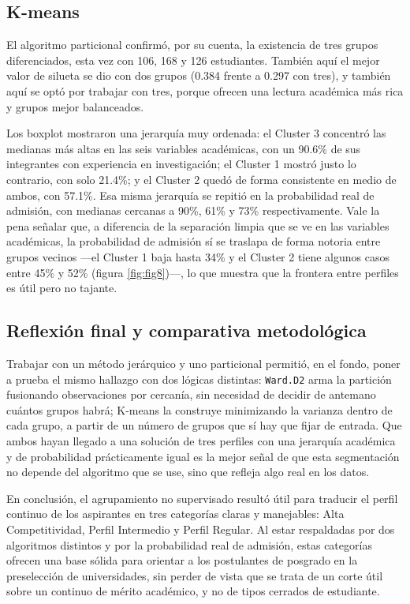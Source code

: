 \documentclass[
  10pt,
  a4paper]{article}
\begin{document}
\subsection{K-means}\label{k-means-1}

El algoritmo particional confirmó, por su cuenta, la existencia de tres grupos diferenciados, esta vez con 106, 168 y 126 estudiantes. También aquí el mejor valor de silueta se dio con dos grupos (0.384 frente a 0.297 con tres), y también aquí se optó por trabajar con tres, porque ofrecen una lectura académica más rica y grupos mejor balanceados.

Los boxplot mostraron una jerarquía muy ordenada: el Cluster 3 concentró las medianas más altas en las seis variables académicas, con un 90.6\% de sus integrantes con experiencia en investigación; el Cluster 1 mostró justo lo contrario, con solo 21.4\%; y el Cluster 2 quedó de forma consistente en medio de ambos, con 57.1\%. Esa misma jerarquía se repitió en la probabilidad real de admisión, con medianas cercanas a 90\%, 61\% y 73\% respectivamente. Vale la pena señalar que, a diferencia de la separación limpia que se ve en las variables académicas, la probabilidad de admisión sí se traslapa de forma notoria entre grupos vecinos ---el Cluster 1 baja hasta 34\% y el Cluster 2 tiene algunos casos entre 45\% y 52\% (figura \ref{fig:fig8})---, lo que muestra que la frontera entre perfiles es útil pero no tajante.

\subsection{Reflexión final y comparativa metodológica}\label{reflexiuxf3n-final-y-comparativa-metodoluxf3gica}

Trabajar con un método jerárquico y uno particional permitió, en el fondo, poner a prueba el mismo hallazgo con dos lógicas distintas: \texttt{Ward.D2} arma la partición fusionando observaciones por cercanía, sin necesidad de decidir de antemano cuántos grupos habrá; K-means la construye minimizando la varianza dentro de cada grupo, a partir de un número de grupos que sí hay que fijar de entrada. Que ambos hayan llegado a una solución de tres perfiles con una jerarquía académica y de probabilidad prácticamente igual es la mejor señal de que esta segmentación no depende del algoritmo que se use, sino que refleja algo real en los datos.

En conclusión, el agrupamiento no supervisado resultó útil para traducir el perfil continuo de los aspirantes en tres categorías claras y manejables: Alta Competitividad, Perfil Intermedio y Perfil Regular. Al estar respaldadas por dos algoritmos distintos y por la probabilidad real de admisión, estas categorías ofrecen una base sólida para orientar a los postulantes de posgrado en la preselección de universidades, sin perder de vista que se trata de un corte útil sobre un continuo de mérito académico, y no de tipos cerrados de estudiante.
\end{document}
